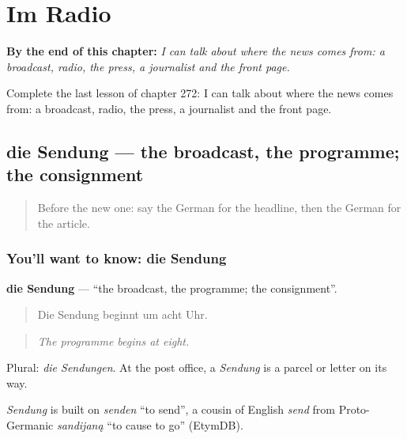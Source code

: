 
\chapter{Im Radio}
\label{ch:ge-im-radio}

\begin{chapteropening}
\textbf{By the end of this chapter:} \emph{I can talk about where the news comes from: a broadcast, radio, the press, a journalist and the front page.}

Complete the last lesson of chapter 272: I can talk about where the news comes from: a broadcast, radio, the press, a journalist and the front page.
\end{chapteropening}

\section[die Sendung]{die Sendung — the broadcast, the programme; the consignment}

\label{lesson:GE-C272-sendung}



\begin{quote}
Before the new one: say the German for the headline, then the German for the article.
\end{quote}

\subsection*{You'll want to know: die Sendung}
\textbf{die Sendung} — \textquotedblleft{}the broadcast, the programme; the consignment\textquotedblright{}.

\begin{quote}
Die Sendung beginnt um acht Uhr.
\end{quote}

\begin{quote}
\emph{The programme begins at eight.}
\end{quote}

Plural: \emph{die Sendungen}. At the post office, a \emph{Sendung} is a parcel or letter on its way.

\begin{cousinweb}
\emph{Sendung} is built on \emph{senden} \textquotedblleft{}to send\textquotedblright{}, a cousin of English \emph{send} from Proto-Germanic \emph{sandijaną} \textquotedblleft{}to cause to go\textquotedblright{} (EtymDB).
\end{cousinweb}

